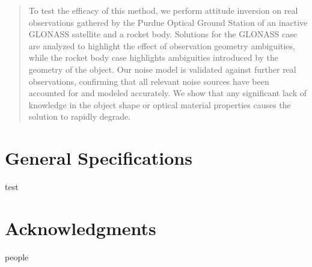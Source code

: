 \documentclass[a4paper,twocolumn]{spaceDebrisC} %
\begin{document}
\begin{abstract}
To test the efficacy of this method, we perform attitude inversion on real observations gathered by the Purdue Optical Ground Station of an inactive GLONASS satellite and a rocket body. Solutions for the GLONASS case are analyzed to highlight the effect of observation geometry ambiguities, while the rocket body case highlights ambiguities introduced by the geometry of the object. Our noise model is validated against further real observations, confirming that all relevant noise sources have been accounted for and modeled accurately. We show that any significant lack of knowledge in the object shape or optical material properties causes the solution to rapidly degrade.

\end{abstract}

\section{General Specifications}

test

\section*{Acknowledgments}

people \cite{robinson2023}







\end{document}
